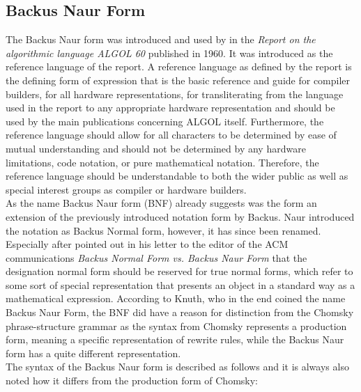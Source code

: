 \documentclass{article}
\begin{document}
\subsection{Backus Naur Form}
The Backus Naur form was introduced and used by \citet{backus1960report} in the \textit{Report on the algorithmic language ALGOL 60} published in 1960. It was introduced as the reference language of the report. A reference language as defined by the report is the defining form of expression that is the basic reference and guide for compiler builders, for all hardware representations, for transliterating from the language used in the report to any appropriate hardware representation and should be used by the main publications concerning ALGOL itself. Furthermore, the reference language should allow for all characters to be determined by ease of mutual understanding and should not be determined by any hardware limitations, code notation, or pure mathematical notation. Therefore, the reference language should be understandable to both the wider public as well as special interest groups as compiler or hardware builders. 
\\
As the name Backus Naur form (BNF) already suggests was the form an extension of the previously introduced notation form by Backus.  Naur introduced the notation as Backus Normal form, however, it has since been renamed. Especially after \citet{knuth-ba} pointed out in his letter to the editor of the ACM communications \textit{Backus Normal Form vs. Backus Naur Form} that the designation normal form should be reserved for true normal forms, which refer to some sort of special representation that presents an object in a standard way as a mathematical expression. According to Knuth, who in the end coined the name Backus Naur Form, the BNF did have a reason for distinction from the Chomsky phrase-structure grammar as the syntax from Chomsky represents a production form, meaning a specific representation of rewrite rules, while the Backus Naur form has a quite different representation.
\\
The syntax of the Backus Naur form is described as follows and it is always also noted how it differs from the production form of Chomsky:
\end{document}
